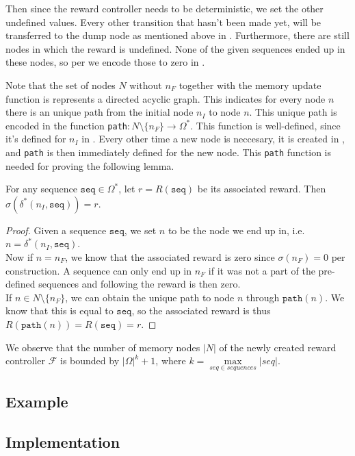 Then since the reward controller needs to be deterministic, we set the other undefined values. Every other transition that hasn't been made yet, will be transferred to the dump node as mentioned above in . Furthermore, there are still nodes in which the reward is undefined. None of the given sequences ended up in these nodes, so per  we encode those to zero in .

Note that the set of nodes $N$ without $n_F$ together with the memory update function is represents a directed acyclic graph. This indicates for every node $n$ there is an unique path from the initial node $n_I$ to node $n$. This unique path is encoded in the function \texttt{path}$:N\setminus\{n_F\}\to\Omega^*$. This function is well-defined, since it's defined for $n_I$ in . Every other time a new node is neccesary, it is created in , and \texttt{path} is then immediately defined for the new node. This \texttt{path} function is needed for proving the following lemma. 


\begin{lemma}
For any sequence $\texttt{seq}\in\Omega^*$, let $r=R(\texttt{seq})$ be its associated reward. Then $\sigma(\delta^*(n_I,\texttt{seq}))=r$.
\begin{proof}
Given a sequence $\texttt{seq}$, we set $n$ to be the node we end up in, i.e. $n = \delta^*(n_I,\texttt{seq})$. \\
Now if $n=n_F$, we know that the associated reward is zero since $\sigma(n_F)=0$ per construction. A sequence can only end up in $n_F$ if it was not a part of the pre-defined sequences and following  the reward is then zero. \\
If $n\in N\setminus \{n_F\}$, we can obtain the unique path to node $n$ through $\texttt{path}(n)$. We know that this is equal to $\texttt{seq}$, so the associated reward is thus $R(\texttt{path}(n))=R(\texttt{seq})=r$.
\end{proof}
\label{lem:proof_seq}
\end{lemma}


We observe that the number of memory nodes $|N|$ of the newly created reward controller $\mathcal{F}$ is bounded by $|\Omega|^k + 1$, where $k=\max\limits_{seq\in sequences} |seq|$.\\

\subsection*{Example}


\subsection*{Implementation}
